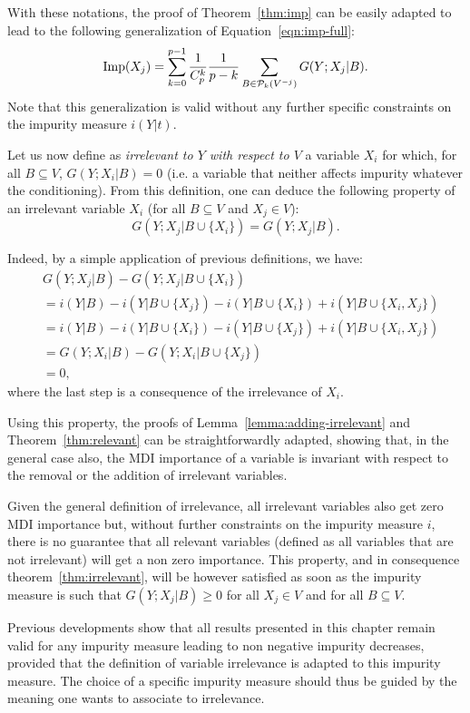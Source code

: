 With these notations, the proof of Theorem~\ref{thm:imp} can be easily adapted to lead
to the following generalization of Equation~\ref{eqn:imp-full}:
\begin{equation}
\text{Imp}(X_j)=\sum_{k=0}^{p-1} \frac{1}{C_p^k} \frac{1}{p-k} \sum_{B \in
  {\cal P}_k(V^{-j})} G(Y;X_j|B).
\end{equation}
Note that this generalization is valid without any further specific constraints
on the impurity measure $i(Y|t)$.

Let us now define as {\it irrelevant to $Y$ with respect to $V$} a
variable $X_i$ for which, for all $B\subseteq V$,
$G(Y;X_i|B)=0$ (i.e. a variable that neither affects impurity
whatever the conditioning). From this definition, one can deduce the
following property of an irrelevant variable $X_i$ (for all
$B\subseteq V$ and $X_j\in V$):
$$G(Y;X_j|B\cup\{X_i\})=G(Y;X_j|B).$$

Indeed, by a simple application of previous definitions, we have:
\begin{align}
& G(Y;X_j|B)-G(Y;X_j|B\cup\{X_i\})  \nonumber \\
& = i(Y|B)-i(Y|B\cup\{X_j\})-i(Y|B\cup\{X_i\})+i(Y|B\cup\{X_i,X_j\})\nonumber\\
& =  i(Y|B)-i(Y|B\cup\{X_i\})-i(Y|B\cup\{X_j\})+i(Y|B\cup\{X_i,X_j\})\nonumber\\
& =  G(Y;X_i|B)-G(Y;X_i|B\cup\{X_j\})\nonumber\\
& =  0,
\end{align}
where the last step is a consequence of the irrelevance of $X_i$.

Using this property, the proofs of Lemma~\ref{lemma:adding-irrelevant}
and Theorem~\ref{thm:relevant} can be straightforwardly adapted, showing that,
in the general case also, the MDI importance of a variable is
invariant with respect to the removal or the addition of irrelevant
variables.

Given the general definition of irrelevance, all irrelevant variables
also get zero MDI importance but, without further constraints on the
impurity measure $i$, there is no guarantee that all relevant
variables (defined as all variables that are not irrelevant) will get
a non zero importance. This property, and in consequence
theorem~\ref{thm:irrelevant}, will be however satisfied as soon as the
impurity measure is such that $G(Y;X_j|B)\geq 0$ for all $X_j\in V$
and for all $B\subseteq V$.

Previous developments show that all results presented in this chapter remain valid for any impurity measure leading to non negative
impurity decreases, provided that the definition of variable
irrelevance is adapted to this impurity measure. The choice of a
specific impurity measure should thus be guided by the meaning one
wants to associate to irrelevance.

